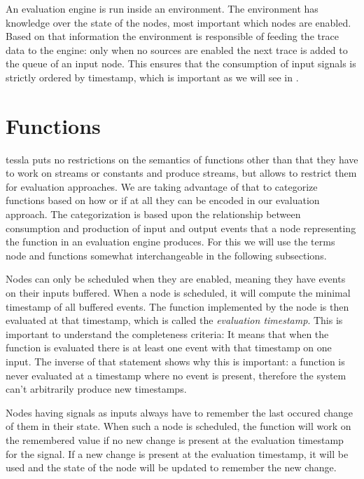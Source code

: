 An evaluation engine is run inside an environment.
The environment has knowledge over the state of the nodes, most important which nodes are enabled.
Based on that information the environment is responsible of feeding the trace data to the engine: only when no sources are enabled the next trace is added to the queue of an input node.
This ensures that the consumption of input signals is strictly ordered by timestamp, which is important as we will see in .


\section{ Functions}
\label{sec:definitions:tessla_functions}

\gls{tessla} puts no restrictions on the semantics of functions other than that they have to work on streams or constants and produce streams, but allows to restrict them for evaluation approaches.
We are taking advantage of that to categorize functions based on how or if at all they can be encoded in our evaluation approach.
The categorization is based upon the relationship between consumption and production of input and output events that a node representing the function in an evaluation engine produces.
For this we will use the terms node and functions somewhat interchangeable in the following subsections.

Nodes can only be scheduled when they are enabled, meaning they have events on their inputs buffered.
When a node is scheduled, it will compute the minimal timestamp of all buffered events.
The function implemented by the node is then evaluated at that timestamp, which is called the \emph{evaluation timestamp}.
This is important to understand the completeness criteria: It means that when the function is evaluated there is at least one event with that timestamp on one input.
The inverse of that statement shows why this is important: a function is never evaluated at a timestamp where no event is present, therefore the system can't arbitrarily produce new timestamps.

Nodes having signals as inputs always have to remember the last occured change of them in their state.
When such a node is scheduled, the function will work on the remembered value if no new change is present at the evaluation timestamp for the signal.
If a new change is present at the evaluation timestamp, it will be used and the state of the node will be updated to remember the new change.

